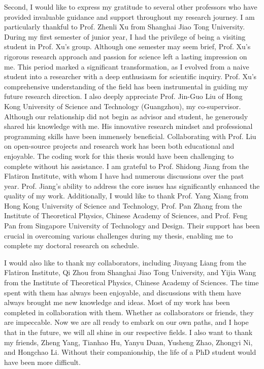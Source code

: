 Second, I would like to express my gratitude to several other professors who have provided invaluable guidance and support throughout my research journey. 
I am particularly thankful to Prof. Zhenli Xu from Shanghai Jiao Tong University. 
During my first semester of junior year, I had the privilege of being a visiting student in Prof. Xu's group.
Although one semester may seem brief, Prof. Xu's rigorous research approach and passion for science left a lasting impression on me. 
This period marked a significant transformation, as I evolved from a naive student into a researcher with a deep enthusiasm for scientific inquiry. Prof. Xu's comprehensive understanding of the field has been instrumental in guiding my future research direction.
I also deeply appreciate Prof. Jin-Guo Liu of Hong Kong University of Science and Technology (Guangzhou), my co-supervisor. 
Although our relationship did not begin as advisor and student, he generously shared his knowledge with me. His innovative research mindset and professional programming skills have been immensely beneficial. 
Collaborating with Prof. Liu on open-source projects and research work has been both educational and enjoyable. The coding work for this thesis would have been challenging to complete without his assistance.
I am grateful to Prof. Shidong Jiang from the Flatiron Institute, with whom I have had numerous discussions over the past year. 
Prof. Jiang's ability to address the core issues has significantly enhanced the quality of my work.
Additionally, I would like to thank Prof. Yang Xiang from Hong Kong University of Science and Technology, Prof. Pan Zhang from the Institute of Theoretical Physics, Chinese Academy of Sciences, and Prof. Feng Pan from Singapore University of Technology and Design. 
Their support has been crucial in overcoming various challenges during my thesis, enabling me to complete my doctoral research on schedule.

I would also like to thank my collaborators, including Jiuyang Liang from the Flatiron Institute, Qi Zhou from Shanghai Jiao Tong University, and Yijia Wang from the Institute of Theoretical Physics, Chinese Academy of Sciences. 
The time spent with them has always been enjoyable, and discussions with them have always brought me new knowledge and ideas. 
Most of my work has been completed in collaboration with them. 
Whether as collaborators or friends, they are impeccable. 
Now we are all ready to embark on our own paths, and I hope that in the future, we will all shine in our respective fields.
I also want to thank my friends, Zheng Yang, Tianhao Hu, Yanyu Duan, Yusheng Zhao, Zhongyi Ni, and Hongchao Li. 
Without their companionship, the life of a PhD student would have been more difficult.


